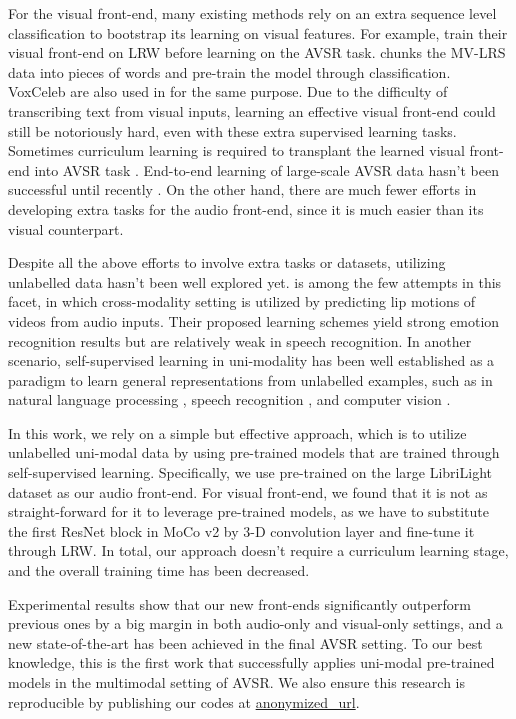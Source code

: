 \documentclass[letterpaper]{article} \usepackage{aaai22}  \usepackage{times}  \usepackage{helvet}  \usepackage{courier}  \usepackage[hyphens]{url}  \usepackage{graphicx} \urlstyle{rm} \def\UrlFont{\rm}  \usepackage{natbib}  \usepackage{caption} \usepackage{amsmath, xparse}
\begin{document}
For the visual front-end, many existing methods rely on an extra sequence level classification to bootstrap its learning on visual features. For example, \citet{avsrhybrid, convseq2seq} train their visual front-end on LRW \cite{LRW} before learning on the AVSR task. \citet{deepavsr, LRS3} chunks the MV-LRS data \cite{chung2017lip} into pieces of words and pre-train the model through classification. VoxCeleb \cite{chung2018voxceleb2} are also used in \citet{afouras2020asr} for the same purpose. Due to the difficulty of transcribing text from visual inputs, learning an effective visual front-end could still be notoriously hard, even with these extra supervised learning tasks. Sometimes curriculum learning is required to transplant the learned visual front-end into AVSR task \cite{deepavsr}. End-to-end learning of large-scale AVSR data hasn't been successful until recently \cite{e2econformer}. On the other hand, there are much fewer efforts in developing extra tasks for the audio front-end, since it is much easier than its visual counterpart. 

Despite all the above efforts to involve extra tasks or datasets, utilizing unlabelled data hasn't been well explored yet. \citet{shukla2020visually} is among the few attempts in this facet, in which cross-modality setting is utilized by predicting lip motions of videos from audio inputs. Their proposed learning schemes yield strong emotion recognition results but are relatively weak in speech recognition. In another scenario, self-supervised learning in uni-modality has been well established as a paradigm to learn general representations from unlabelled examples, such as in natural language processing \cite{brown2020language, devlin2018bert}, speech recognition \cite{wav2vec2}, and computer vision \cite{mocov1, simclr, byol}.

In this work, we rely on a simple but effective approach, which is to utilize unlabelled uni-modal data by using pre-trained models that are trained through self-supervised learning. Specifically, we use \citet{wav2vec2} pre-trained on the large LibriLight \cite{librilight} dataset as our audio front-end. For visual front-end, we found that it is not as straight-forward for it to leverage pre-trained models, as we have to substitute the first ResNet block in MoCo v2 \cite{mocov2} by 3-D convolution layer and fine-tune it through LRW. In total, our approach doesn't require a curriculum learning stage, and the overall training time has been decreased. 

Experimental results show that our new front-ends significantly outperform previous ones by a big margin in both audio-only and visual-only settings, and a new state-of-the-art has been achieved in the final AVSR setting. To our best knowledge, this is the first work that successfully applies uni-modal pre-trained models in the multimodal setting of AVSR. We also ensure this research is reproducible by publishing our codes at \url{anonymized_url}.
\end{document}

